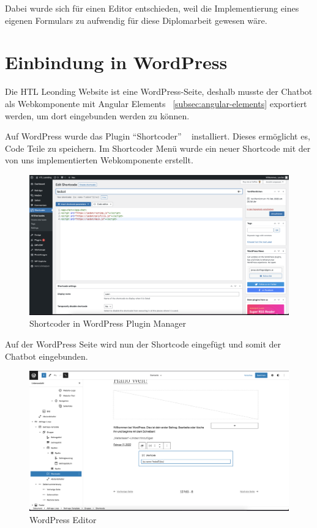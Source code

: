 Dabei wurde sich für einen Editor entschieden, weil die Implementierung eines eigenen Formulars zu aufwendig für diese Diplomarbeit gewesen wäre.

\section{Einbindung in WordPress}
Die HTL Leonding Website ist eine WordPress-Seite, deshalb musste der Chatbot als Webkomponente mit Angular Elements ~\ref{subsec:angular-elements} exportiert werden, um dort eingebunden werden zu können.

Auf WordPress wurde das Plugin ``Shortcoder'' ~\cite{shortcoder} installiert.
Dieses ermöglicht es, Code Teile zu speichern.
Im Shortcoder Menü wurde ein neuer Shortcode mit der von uns implementierten Webkomponente erstellt.

\begin{figure}[hbt!]
    \centering
    \includegraphics[scale=0.2]{pics/shortcoder}
    \caption{Shortcoder in WordPress Plugin Manager}
    \label{fig:impl:shortcoder}
\end{figure}

Auf der WordPress Seite wird nun der Shortcode eingefügt und somit der Chatbot eingebunden.

\begin{figure}[hbt!]
    \centering
    \includegraphics[scale=0.2]{pics/wordpressedit}
    \caption{WordPress Editor}
    \label{fig:impl:wordpressedit}
\end{figure}


